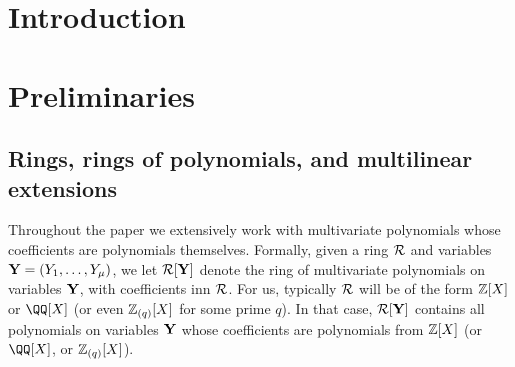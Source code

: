 \documentclass[11pt,letterpaper,usenames,dvipsnames]{article}
\title{\stylizedtitle}
\author{
Albert Garreta, Psi Vesely, Arantxa Zapico
}
\date{\today}
\begin{document}
\maketitle

\begin{abstract}
\end{abstract}

\setcounter{tocdepth}{3}
\begin{spacing}{0.8}
{\footnotesize \tableofcontents}
\end{spacing}
\section{Introduction}
\label{sec:introduction}



\section{Preliminaries}
\label{sec:preliminaries}

      

\subsection{Rings, rings of polynomials, and multilinear extensions}
\label{sec:rings-and-multilinear-extensions}

Throughout the paper we extensively work with multivariate polynomials whose coefficients are polynomials themselves. Formally, given a ring $\mathcal{R}$ and variables $\mathbf{Y}=(Y_1,\ldots, Y_\mu)$, we let $\mathcal{R}[\mathbf{Y}]$ denote the ring of multivariate polynomials on variables $\mathbf{Y}$, with coefficients inn $\mathcal{R}$. For us, typically $\mathcal{R}$ will be of the form $\mathbb{Z}[X]$ or $\QQ[X]$ (or even $\mathbb{Z}_{(q)}[X]$ for some prime $q$). In that case, $\mathcal{R}[\mathbf{Y}]$ contains all polynomials on variables $\mathbf{Y}$ whose coefficients are polynomials from $\mathbb{Z}[X]$ (or $\QQ[X]$, or $\mathbb{Z}_{(q)}[X]$). 
\end{document}

